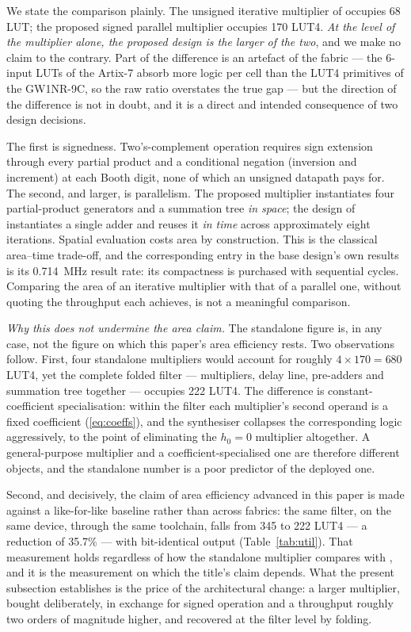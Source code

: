 \documentclass[conference]{IEEEtran}
\begin{document}
We state the comparison plainly. The unsigned iterative multiplier of
\cite{base} occupies 68 LUT; the proposed signed parallel multiplier
occupies 170 LUT4. \emph{At the level of the multiplier alone, the
proposed design is the larger of the two}, and we make no claim to the
contrary. Part of the difference is an artefact of the fabric --- the
6-input LUTs of the Artix-7 absorb more logic per cell than the LUT4
primitives of the GW1NR-9C, so the raw ratio overstates the true gap ---
but the direction of the difference is not in doubt, and it is a direct
and intended consequence of two design decisions.

The first is signedness. Two's-complement operation requires sign
extension through every partial product and a conditional negation
(inversion and increment) at each Booth digit, none of which an unsigned
datapath pays for. The second, and larger, is parallelism. The proposed
multiplier instantiates four partial-product generators and a summation
tree \emph{in space}; the design of \cite{base} instantiates a single
adder and reuses it \emph{in time} across approximately eight
iterations. Spatial evaluation costs area by construction. This is the
classical area--time trade-off, and the corresponding entry in the base
design's own results is its 0.714~MHz result rate: its compactness is
purchased with sequential cycles. Comparing the area of an iterative
multiplier with that of a parallel one, without quoting the throughput
each achieves, is not a meaningful comparison.

\smallskip\noindent\textit{Why this does not undermine the area claim.}
The standalone figure is, in any case, not the figure on which this
paper's area efficiency rests. Two observations follow. First, four
standalone multipliers would account for roughly $4 \times 170 = 680$
LUT4, yet the complete folded filter --- multipliers, delay line,
pre-adders and summation tree together --- occupies 222 LUT4. The
difference is constant-coefficient specialisation: within the filter each
multiplier's second operand is a fixed coefficient
(\eqref{eq:coeffs}), and the synthesiser collapses the corresponding
logic aggressively, to the point of eliminating the $h_0 = 0$ multiplier
altogether. A general-purpose multiplier and a coefficient-specialised
one are therefore different objects, and the standalone number is a poor
predictor of the deployed one.

Second, and decisively, the claim of area efficiency advanced in this
paper is made against a like-for-like baseline rather than across
fabrics: the same filter, on the same device, through the same
toolchain, falls from 345 to 222 LUT4 --- a reduction of 35.7\% --- with
bit-identical output (Table~\ref{tab:util}). That measurement holds
regardless of how the standalone multiplier compares with \cite{base},
and it is the measurement on which the title's claim depends. What the
present subsection establishes is the price of the architectural change:
a larger multiplier, bought deliberately, in exchange for signed
operation and a throughput roughly two orders of magnitude higher, and
recovered at the filter level by folding.
\end{document}
